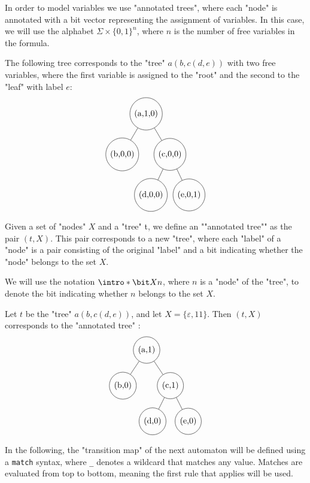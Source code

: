 \documentclass[a4paper,UKenglish,cleveref, autoref, thm-restate]{lipics-v2021}
\begin{document}
In order to model variables we use "annotated trees", where each "node" is annotated with a bit vector representing the assignment of variables.
In this case, we will use the alphabet $\Sigma \times \{0,1\}^n$, where $n$ is the number of free variables in the formula.

\begin{example}
	The following tree corresponds to the "tree" $a(b,c(d,e))$ with two free variables, where the first variable is assigned to the "root" and the second to the "leaf"
	with label $e$:
	\[
		\begin{tikzpicture}[level distance=1.7cm,
				every node/.style={draw, circle, minimum size=5mm},
				level 1/.style={sibling distance=2cm},
				level 2/.style={sibling distance=1.6cm}]
			\node {(a,1,0)}
			child { node {(b,0,0)}}
			child { node {(c,0,0)}
					child {node {(d,0,0)}}
					child {node {(e,0,1)}} };
		\end{tikzpicture}
	\]

\end{example}

\begin{definition}
	Given a set of "nodes" $X$ and a "tree" t, we define an ""annotated tree"" as the pair $(t, X)$. This pair
	corresponds to a new "tree", where each "label" of a "node" is a pair consisting of the original "label" and a bit indicating whether the "node" belongs to the set $X$.

	We will use the notation $\intro*\bit X n $, where $n$ is a "node" of the "tree", to denote the bit indicating whether $n$ belongs to the set $X$.
\end{definition}

\begin{example}
	Let $t$ be the "tree" $a(b,c(d,e))$, and let $X = \{\varepsilon,11\}$.
	Then $(t, X)$ corresponds to the "annotated tree" :
	\[
		\begin{tikzpicture}[level distance=1.5cm,
				every node/.style={draw, circle, minimum size=5mm},
				level 1/.style={sibling distance=2cm},
				level 2/.style={sibling distance=1.5cm}]
			\node {(a,1)}
			child { node {(b,0)}}
			child { node {(c,1)}
					child {node {(d,0)}}
					child {node {(e,0)}} };
		\end{tikzpicture}
	\]
\end{example}




In the following, the "transition map" of the next automaton will be defined using a \texttt{match} syntax, where \texttt{\_}
denotes a wildcard that matches any value. Matches are evaluated from top to bottom, meaning the first rule that applies will be used.
\end{document}
